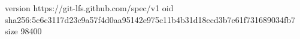 version https://git-lfs.github.com/spec/v1
oid sha256:5c6c3117d23c9a57f4d0aa95142e975c11b4b31d18ecd3b7e61f731689034fb7
size 98400
